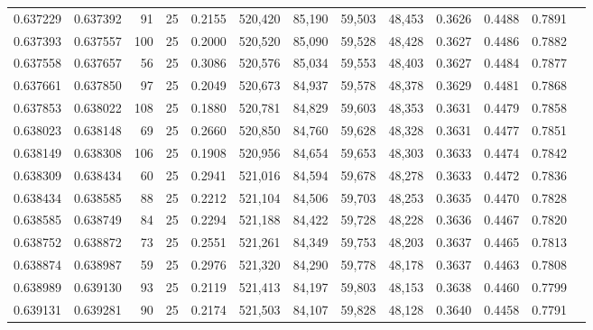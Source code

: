 \begin{tabular}{rrrrrrrrrrrrr}
0.637229 & 0.637392 &    91 &  25 &                                     0.2155 & 520,420 &  85,190 &  59,503 &  48,453 & 0.3626 & 0.4488 & 0.7891 \\
0.637393 & 0.637557 &   100 &  25 &                                     0.2000 & 520,520 &  85,090 &  59,528 &  48,428 & 0.3627 & 0.4486 & 0.7882 \\
0.637558 & 0.637657 &    56 &  25 &                                     0.3086 & 520,576 &  85,034 &  59,553 &  48,403 & 0.3627 & 0.4484 & 0.7877 \\
0.637661 & 0.637850 &    97 &  25 &                                     0.2049 & 520,673 &  84,937 &  59,578 &  48,378 & 0.3629 & 0.4481 & 0.7868 \\
0.637853 & 0.638022 &   108 &  25 &                                     0.1880 & 520,781 &  84,829 &  59,603 &  48,353 & 0.3631 & 0.4479 & 0.7858 \\
0.638023 & 0.638148 &    69 &  25 &                                     0.2660 & 520,850 &  84,760 &  59,628 &  48,328 & 0.3631 & 0.4477 & 0.7851 \\
0.638149 & 0.638308 &   106 &  25 &                                     0.1908 & 520,956 &  84,654 &  59,653 &  48,303 & 0.3633 & 0.4474 & 0.7842 \\
0.638309 & 0.638434 &    60 &  25 &                                     0.2941 & 521,016 &  84,594 &  59,678 &  48,278 & 0.3633 & 0.4472 & 0.7836 \\
0.638434 & 0.638585 &    88 &  25 &                                     0.2212 & 521,104 &  84,506 &  59,703 &  48,253 & 0.3635 & 0.4470 & 0.7828 \\
0.638585 & 0.638749 &    84 &  25 &                                     0.2294 & 521,188 &  84,422 &  59,728 &  48,228 & 0.3636 & 0.4467 & 0.7820 \\
0.638752 & 0.638872 &    73 &  25 &                                     0.2551 & 521,261 &  84,349 &  59,753 &  48,203 & 0.3637 & 0.4465 & 0.7813 \\
0.638874 & 0.638987 &    59 &  25 &                                     0.2976 & 521,320 &  84,290 &  59,778 &  48,178 & 0.3637 & 0.4463 & 0.7808 \\
0.638989 & 0.639130 &    93 &  25 &                                     0.2119 & 521,413 &  84,197 &  59,803 &  48,153 & 0.3638 & 0.4460 & 0.7799 \\
0.639131 & 0.639281 &    90 &  25 &                                     0.2174 & 521,503 &  84,107 &  59,828 &  48,128 & 0.3640 & 0.4458 & 0.7791 \\

\end{tabular}
